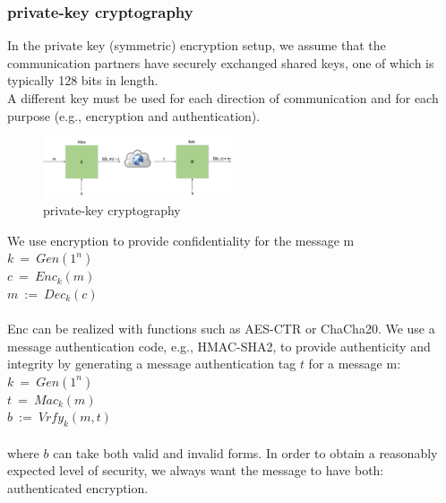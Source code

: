 \subsubsection{private-key cryptography}\cite{b38}
In the private key (symmetric) encryption setup, we assume that the communication partners 
have securely exchanged shared keys, one of which is typically 128 bits in length.
\\
A different key must be used for each direction of communication and for each purpose 
(e.g., encryption and authentication).
\begin{figure}[H] %
    \centering %
    \includegraphics[width=0.5\textwidth]{figures/private.png} %
    \caption{private-key cryptography} %
    \label{Fig.2: private-key cryptography} %
\end{figure}
We use encryption to provide confidentiality for the message m
\\
$k \ = \ Gen(1^n)$
\\
$c \ = \ Enc_k(m)$
\\
$m \ := \ Dec_k(c)$
\\
\\
Enc can be realized with functions such as AES-CTR or ChaCha20.
We use a message authentication code, e.g., HMAC-SHA2, to provide authenticity and 
integrity by generating a message authentication tag $t$ for a message m:
\\
$k \ = \ Gen(1^n)$
\\
$t \ = \ Mac_k(m)$
\\
$b \ := \ Vrfy_k(m, t)$
\\
\\
where $b$ can take both valid and invalid forms.
In order to obtain a reasonably expected level of security, we always want the message 
to have both: authenticated encryption.

